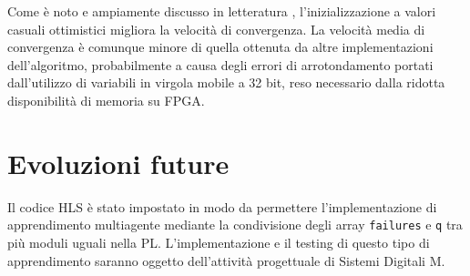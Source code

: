 \documentclass{article}
\begin{document}
	Come è noto e ampiamente discusso in letteratura \citep{sutton_reinforcement_2018}, l'inizializzazione a valori casuali ottimistici migliora la velocità di convergenza. 
	La velocità media di convergenza è comunque minore di quella ottenuta da altre implementazioni dell'algoritmo, probabilmente a causa degli errori di arrotondamento portati dall'utilizzo di variabili in virgola mobile a 32 bit, reso necessario dalla ridotta disponibilità di memoria su FPGA.
	\section{Evoluzioni future}
	Il codice HLS è stato impostato in modo da permettere l'implementazione di apprendimento multiagente \citep{kretchmar_parallel_2002} mediante la condivisione degli array \texttt{failures} e \texttt{q} tra più moduli uguali nella PL.
	L'implementazione e il testing di questo tipo di apprendimento saranno oggetto dell'attività progettuale di Sistemi Digitali M.
	
	
	
\end{document}
